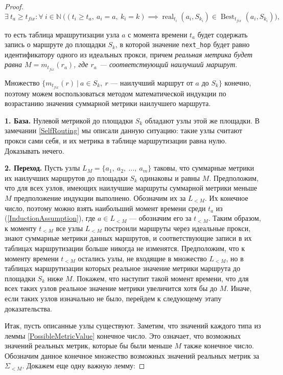 \documentclass{article}
\theoremstyle{plain}
\theoremstyle{plain}
\theoremstyle{plain}
\theoremstyle{plain}
\theoremstyle{definition}
\theoremstyle{remark}
\theoremstyle{plain}
\DeclareMathOperator*{\real}{real}
\DeclareMathOperator*{\best}{Best}
\begin{document}
\begin{proof}
    \begin{equation}
    \label{InductionAssumption}
        \exists\ t_a \geq t_{fix} : \forall\ i \in \mathbb{N}\ \Big( (t_i \geq t_a,\ a_i = a,\ k_i = k) \implies {\real}_{t_i}(a_i, S_{k_i}) \in {\best}_{t_{fix}}(a_i, S_{k_i}) \Big),
    \end{equation}
    
    то есть таблица мрашрутизации узла $a$ с момента времени $t_a$ будет содержать запись о маршруте до площадки $S_k$, в которой значение \texttt{next\_hop} будет равно идентификатору одного из идеальных прокси, причем \textit{реальная метрика будет равна $M = m_{t_{fix}}(r_a)$, где $r_a$ --- соответствующий наилучший маршрут}.
    
    Множество $\{ m_{t_{fix}}(r)\ |\ a \in S_k,\ r \text{ --- наилучший маршрут от } a \text{ до } S_k \}$ конечно, поэтому можем воспользоваться методом математической индукции по возрастанию значения суммарной метрики наилучшего маршрута.
    
    \textbf{1. База.} Нулевой метрикой до площадки $S_k$ обладают узлы этой же площадки. В замечании \ref{SelfRouting} мы описали данную ситуацию: такие узлы считают прокси сами себя, и их метрика в таблице маршрутизации равна нулю. Доказывать нечего.
    
    \textbf{2. Переход.} Пусть узлы $L_M = \{ a_1,\ a_2,\ \ldots,\ a_m \}$ таковы, что суммарные метрики их наилучших маршрутов до площадки $S_k$ одинаковы и равны $M$. Предположим, что для всех узлов, имеющих наилучшие маршруты суммарной метрики меньше $M$ предположение индукции выполнено. Обозначим их за $L_{< M}$. Их конечное число, поэтому можно взять наибольший момент времени среди $t_a$ из (\ref{InductionAssumption}), где $a \in L_{< M}$ --- обозначим его за $t_{< M}$. Таким образом, к моменту $t_{< M}$ все узлы $L_{< M}$ построили маршруты через идеальные прокси, знают суммарные метрики данных маршрутов, и соответствующие записи в их таблицах маршрутизации больше никогда не изменятся. Предположим, что к моменту времени $t_{< M}$ остались узлы, не входящие в множество $L_{< M}$, но в таблицах маршрутизации которых реальное значение метрики маршрута до площадки $S_k$ ниже $M$. Покажем, что наступит такой момент времени, что для всех таких узлов реальное значение метрики увеличится хотя бы до $M$. Иначе, если таких узлов изначально не было, перейдем к следующему этапу доказательства.
    
    Итак, пусть описанные узлы существуют. Заметим, что значений каждого типа из леммы \ref{PossibleMetricValue} конечное число. Это означает, что возможных значений реальных метрик, которые бы были меньше $M$ также конечное число. Обозначим данное конечное множество возможных значений реальных метрик за $\Sigma_{< M}$. Докажем еще одну важную лемму:
    

\end{proof}
\end{document}
